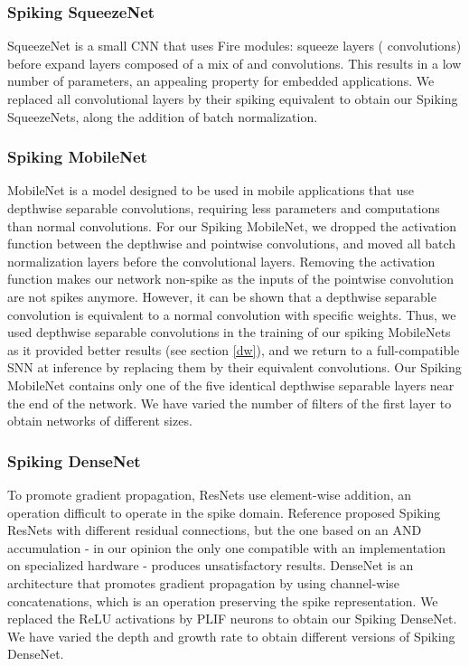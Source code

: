 \documentclass[conference]{IEEEtran}
\begin{document}
\subsubsection{Spiking SqueezeNet}
SqueezeNet \cite{squeezenet} is a small CNN that uses Fire modules: squeeze layers ( convolutions) before expand layers composed of a mix of  and  convolutions. This results in a low number of parameters, an appealing property for embedded applications. We replaced all convolutional layers by their spiking equivalent to obtain our Spiking SqueezeNets, along the addition of batch normalization. \\

\subsubsection{Spiking MobileNet}
MobileNet \cite{mobilenet} is a model designed to be used in mobile applications that use depthwise separable convolutions, requiring less parameters and computations than normal convolutions. For our Spiking MobileNet, we dropped the activation function between the depthwise and pointwise convolutions, and moved all batch normalization layers before the convolutional layers. Removing the activation function makes our network non-spike as the inputs of the pointwise convolution are not spikes anymore. However, it can be shown that a depthwise separable convolution is equivalent to a normal convolution with specific weights. Thus, we used depthwise separable convolutions in the training of our spiking MobileNets as it provided better results (see section \ref{dw}), and we return to a full-compatible SNN at inference by replacing them by their equivalent convolutions. Our Spiking MobileNet contains only one of the five identical depthwise separable layers near the end of the network. We have varied the number of filters of the first layer to obtain networks of different sizes. \\

\subsubsection{Spiking DenseNet}
To promote gradient propagation, ResNets use element-wise addition, an operation difficult to operate in the spike domain. Reference \cite{wei_neurips} proposed Spiking ResNets with different residual connections, but the one based on an AND accumulation - in our opinion the only one compatible with an implementation on specialized hardware - produces unsatisfactory results. DenseNet \cite{densenet} is an architecture that promotes gradient propagation by using channel-wise concatenations, which is an operation preserving the spike representation. We replaced the ReLU activations by PLIF neurons to obtain our Spiking DenseNet. We have varied the depth and growth rate to obtain different versions of Spiking DenseNet.
\end{document}
